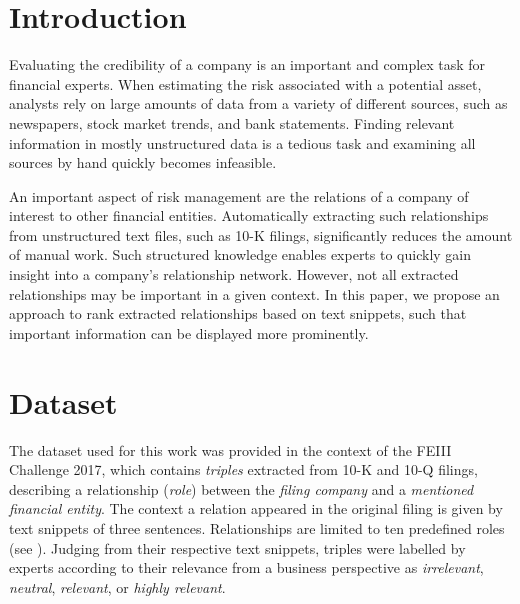 \section{Introduction}

Evaluating the credibility of a company is an important and complex task for financial experts.
When estimating the risk associated with a potential asset, analysts rely on large amounts of data from a variety of different sources, such as newspapers, stock market trends, and bank statements.
Finding relevant information in mostly unstructured data is a tedious task and examining all sources by hand quickly becomes infeasible.

An important aspect of risk management are the relations of a company of interest to other financial entities.
Automatically extracting such relationships from unstructured text files, such as 10-K filings, significantly reduces the amount of manual work.
Such structured knowledge enables experts to quickly gain insight into a company's relationship network.
However, not all extracted relationships may be important in a given context.
In this paper, we propose an approach to rank extracted relationships based on text snippets, such that important information can be displayed more prominently.


\section{Dataset}
The dataset used for this work was provided in the context of the FEIII Challenge 2017\cite{feiii_overview}, which contains \emph{triples} extracted from 10-K and 10-Q filings, describing a relationship (\emph{role}) between the \emph{filing company} and a \emph{mentioned financial entity}.
The context a relation appeared in the original filing is given by text snippets of three sentences.
Relationships are limited to ten predefined roles (see ).
Judging from their respective text snippets, triples were labelled by experts according to their relevance from a business perspective as \emph{irrelevant}, \emph{neutral}, \emph{relevant}, or \emph{highly relevant}.

